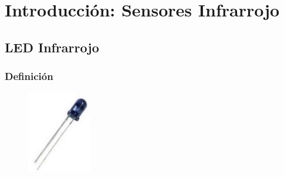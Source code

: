 \documentclass[12pt, fleqn]{article}                            %
\theoremstyle{break}                                            %
\begin{document}
\restoregeometry                                                    %
\nopagecolor                                                        %




\tableofcontents{}
\label{sec:Index}

\clearpage



\section{Introducción: Sensores Infrarrojo}


    \subsection{LED Infrarrojo}


        \subsubsection{Definición}

            \begin{figure}
                \centering
                \includegraphics[width=0.25\textwidth]{LEDInfrarrojo}
            \end{figure}
\end{document}
